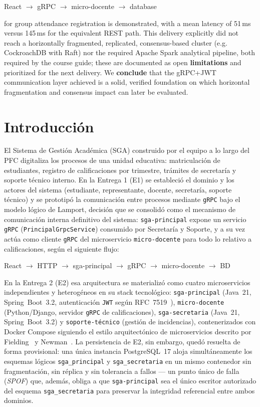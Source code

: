 \documentclass[12pt,a4paper]{article}
\newcommand{\flujo}[1]{%
  \begin{center}
  \small\ttfamily #1
  \end{center}%
}
\begin{document}
\flujo{React $\to$ gRPC $\to$ micro-docente $\to$ database}

\noindent for group attendance registration is demonstrated, with a mean
latency of 51\,ms versus 145\,ms for the equivalent REST path. This
delivery explicitly did not reach a horizontally fragmented, replicated,
consensus-based cluster (e.g. CockroachDB with Raft) nor the required
Apache Spark analytical pipeline, both required by the course guide; these
are documented as open \textbf{limitations} and prioritized for the next
delivery. We \textbf{conclude} that the gRPC+JWT communication layer
achieved is a solid, verified foundation on which horizontal fragmentation
and consensus impact can later be evaluated.

\newpage

\section{Introducción}
\label{sec:introduccion}

El Sistema de Gestión Académica (SGA) construido por el equipo a lo largo del
PFC digitaliza los procesos de una unidad educativa: matriculación de
estudiantes, registro de calificaciones por trimestre, trámites de
secretaría y soporte técnico interno. En la Entrega 1 (E1) se estableció el
dominio y los actores del sistema (estudiante, representante, docente,
secretaría, soporte técnico) y se prototipó la comunicación entre procesos
mediante \texttt{gRPC} bajo el modelo lógico de Lamport, decisión que se
consolidó como el mecanismo de comunicación interna definitivo del sistema:
\texttt{sga-principal} expone un servicio \texttt{gRPC}
(\texttt{PrincipalGrpcService}) consumido por Secretaría y Soporte, y a su
vez actúa como cliente \texttt{gRPC} del microservicio \texttt{micro-docente}
para todo lo relativo a calificaciones, según el siguiente flujo:

\flujo{React $\to$ HTTP $\to$ sga-principal $\to$ gRPC $\to$ micro-docente $\to$ BD}

En la Entrega 2 (E2) esa arquitectura se materializó como cuatro
microservicios independientes y heterogéneos en su stack tecnológico:
\texttt{sga-principal} (Java~21, Spring~Boot~3.2, autenticación
\texttt{JWT} según RFC~7519~\cite{jones2015jwt}), \texttt{micro-docente}
(Python/Django, servidor \texttt{gRPC} de calificaciones),
\texttt{sga-secretaria} (Java~21, Spring~Boot~3.2) y
\texttt{soporte-técnico} (gestión de incidencias), contenerizados con Docker
Compose siguiendo el estilo arquitectónico de microservicios descrito por
Fielding~\cite{fielding2000architectural} y Newman~\cite{newman2021microservices}.
La persistencia de E2, sin embargo, quedó resuelta de forma provisional: una
única instancia PostgreSQL~17 aloja simultáneamente los esquemas lógicos
\texttt{sga\_principal} y \texttt{sga\_secretaria} en un mismo contenedor sin
fragmentación, sin réplica y sin tolerancia a fallos --- un punto único de
falla (\emph{SPOF}) que, además, obliga a que \texttt{sga-principal} sea el
único escritor autorizado del esquema \texttt{sga\_secretaria} para preservar
la integridad referencial entre ambos dominios.
\end{document}
